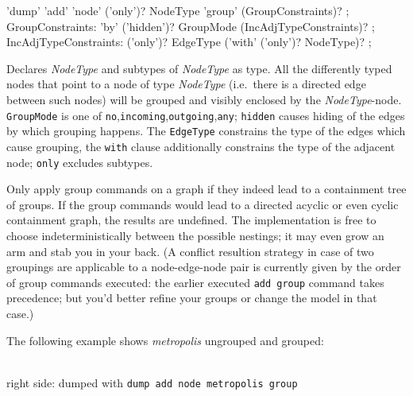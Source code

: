 \begin{rail}
  'dump' 'add' 'node' ('only')? NodeType 'group' (GroupConstraints)? ;
GroupConstraints:
  'by' ('hidden')? GroupMode (IncAdjTypeConstraints)? ;
IncAdjTypeConstraints:
  ('only')? EdgeType ('with' ('only')? NodeType)? ;
\end{rail}
Declares \emph{NodeType} and subtypes of \emph{NodeType} as  type.
All the differently typed nodes that point to a node of type \emph{NodeType} 
(i.e.\ there is a directed edge between such nodes) will be grouped and visibly enclosed by the \emph{NodeType}-node.
\texttt{GroupMode} is one of \texttt{no},\texttt{incoming},\texttt{outgoing},\texttt{any}; \texttt{hidden} causes hiding of the edges by which grouping happens.
The \texttt{EdgeType} constrains the type of the edges which cause grouping, the \texttt{with} clause additionally constrains the type of the adjacent node; 
\texttt{only} excludes subtypes.

\begin{note}
Only apply group commands on a graph if they indeed lead to a containment tree of groups.
If the group commands would lead to a directed acyclic or even cyclic containment graph, the results are undefined.
The implementation is free to choose indeterministically between the possible nestings; it may even grow an arm and stab you in your back.
(A conflict resultion strategy in case of two groupings are applicable to a node-edge-node pair is currently given by the order of group commands executed:
the earlier executed \texttt{add group} command takes precedence; but you'd better refine your groups or change the model in that case.)
\end{note}

The following example shows \emph{metropolis} ungrouped and grouped:
\begin{center}
    \hfill {}\\
  {\small right side: dumped with \texttt{dump add node metropolis group}}
\end{center}

